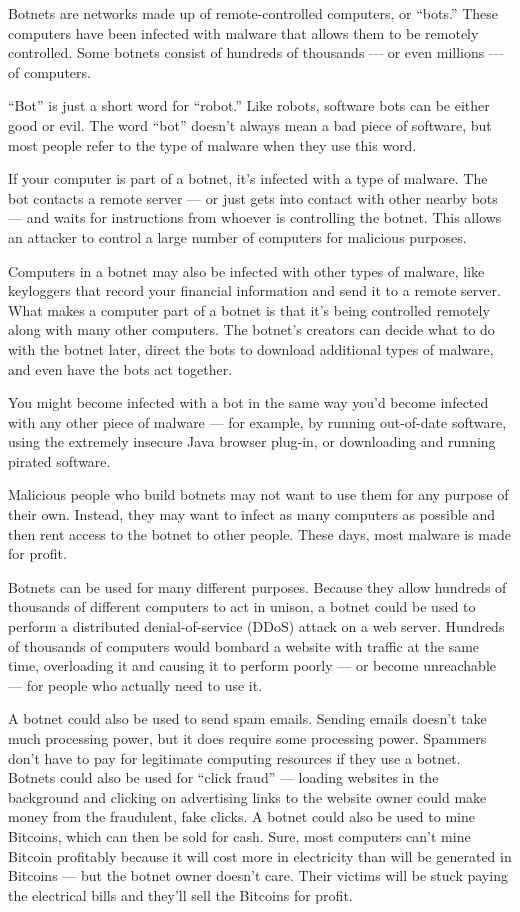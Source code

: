 Botnets are networks made up of remote-controlled computers, or “bots.” These computers have been infected with malware that allows them to be remotely controlled. Some botnets consist of hundreds of thousands — or even millions — of computers.

“Bot” is just a short word for “robot.” Like robots, software bots can be either good or evil. The word “bot” doesn’t always mean a bad piece of software, but most people refer to the type of malware when they use this word.

If your computer is part of a botnet, it’s infected with a type of malware. The bot contacts a remote server — or just gets into contact with other nearby bots — and waits for instructions from whoever is controlling the botnet. This allows an attacker to control a large number of computers for malicious purposes.

Computers in a botnet may also be infected with other types of malware, like keyloggers that record your financial information and send it to a remote server. What makes a computer part of a botnet is that it’s being controlled remotely along with many other computers. The botnet’s creators can decide what to do with the botnet later, direct the bots to download additional types of malware, and even have the bots act together.

You might become infected with a bot in the same way you’d become infected with any other piece of malware — for example, by running out-of-date software, using the extremely insecure Java browser plug-in, or downloading and running pirated software.

Malicious people who build botnets may not want to use them for any purpose of their own. Instead, they may want to infect as many computers as possible and then rent access to the botnet to other people. These days, most malware is made for profit.

Botnets can be used for many different purposes. Because they allow hundreds of thousands of different computers to act in unison, a botnet could be used to perform a distributed denial-of-service (DDoS) attack on a web server.  Hundreds of thousands of computers would bombard a website with traffic at the same time, overloading it and causing it to perform poorly — or become unreachable — for people who actually need to use it.

A botnet could also be used to send spam emails. Sending emails doesn’t take much processing power, but it does require some processing power. Spammers don’t have to pay for legitimate computing resources if they use a botnet. Botnets could also be used for “click fraud” — loading websites in the background and clicking on advertising links to the website owner could make money from the fraudulent, fake clicks. A botnet could also be used to mine Bitcoins, which can then be sold for cash. Sure, most computers can’t mine Bitcoin profitably because it will cost more in electricity than will be generated in Bitcoins — but the botnet owner doesn’t care. Their victims will be stuck paying the electrical bills and they’ll sell the Bitcoins for profit.

